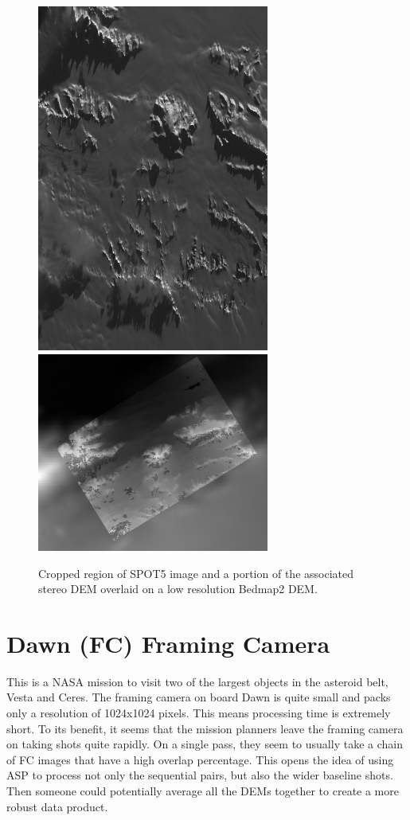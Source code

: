 \begin{figure}[h!]
\centering
  \includegraphics[width=3.0in]{images/examples/spot5_preview.png}
  \includegraphics[width=3.0in]{images/examples/spot5_dem.png}
\caption{Cropped region of SPOT5 image and a portion of the associated stereo 
         DEM overlaid on a low resolution Bedmap2 DEM.}
\label{fig:spot5_output}
\end{figure}

\section{Dawn (FC) Framing Camera}

This is a NASA mission to visit two of the largest objects in the
asteroid belt, Vesta and Ceres. The framing camera on board Dawn is
quite small and packs only a resolution of 1024x1024 pixels. This means
processing time is extremely short. To its benefit, it seems that the
mission planners leave the framing camera on taking shots quite
rapidly. On a single pass, they seem to usually take a chain of FC
images that have a high overlap percentage. This opens the idea of using
ASP to process not only the sequential pairs, but also the wider
baseline shots. Then someone could potentially average all the DEMs
together to create a more robust data product.

